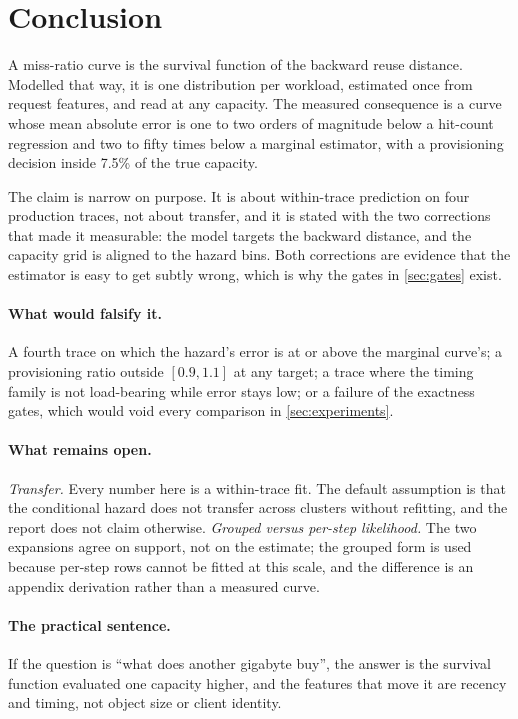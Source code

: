 \section{Conclusion}
\label{sec:conclusion}

A miss-ratio curve is the survival function of the backward reuse distance. Modelled
that way, it is one distribution per workload, estimated once from request features,
and read at any capacity. The measured consequence is a curve whose mean absolute
error is one to two orders of magnitude below a hit-count regression and two to
fifty times below a marginal estimator, with a provisioning decision inside 7.5\%
of the true capacity.

The claim is narrow on purpose. It is about within-trace prediction on four
production traces, not about transfer, and it is stated with the two corrections that
made it measurable: the model targets the backward distance, and the capacity grid
is aligned to the hazard bins. Both corrections are evidence that the estimator is
easy to get subtly wrong, which is why the gates in \cref{sec:gates} exist.

\paragraph{What would falsify it.}
A fourth trace on which the hazard's error is at or above the marginal curve's; a
provisioning ratio outside $[0.9,1.1]$ at any target; a trace where the timing family
is not load-bearing while error stays low; or a failure of the exactness gates, which
would void every comparison in \cref{sec:experiments}.

\paragraph{What remains open.}
\emph{Transfer.} Every number here is a within-trace fit. The default assumption is
that the conditional hazard does not transfer across clusters without refitting, and
the report does not claim otherwise. \emph{Grouped versus per-step likelihood.} The
two expansions agree on support, not on the estimate; the grouped form is used
because per-step rows cannot be fitted at this scale, and the difference is an
appendix derivation rather than a measured curve.

\paragraph{The practical sentence.}
If the question is ``what does another gigabyte buy'', the answer is the survival
function evaluated one capacity higher, and the features that move it are recency and
timing, not object size or client identity.

